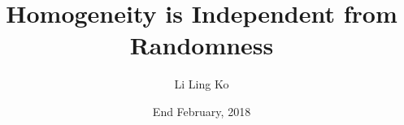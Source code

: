 \documentclass[notes]{beamer}
\title{Homogeneity is Independent from Randomness}
\author{Li Ling Ko}
\institute{University of Notre Dame}
\date{End February, 2018}
\begin{document}
\begin{frame}
  \titlepage
\end{frame}






\end{document}
